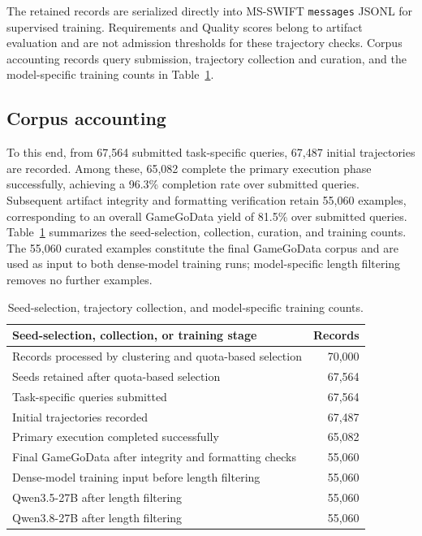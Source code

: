 \documentclass{article}
\begin{document}
The retained records are serialized directly into MS-SWIFT \texttt{messages} JSONL for supervised training. Requirements and Quality scores belong to artifact evaluation and are not admission thresholds for these trajectory checks. Corpus accounting records query submission, trajectory collection and curation, and the model-specific training counts in Table~\ref{tab:corpus_accounting}.

\subsection{Corpus accounting}
\label{app:corpus_accounting}

To this end, from 67{,}564 submitted task-specific queries, 67{,}487 initial trajectories are recorded. Among these, 65{,}082 complete the primary execution phase successfully, achieving a 96.3\% completion rate over submitted queries. Subsequent artifact integrity and formatting verification retain 55{,}060 examples, corresponding to an overall GameGoData yield of 81.5\% over submitted queries. Table~\ref{tab:corpus_accounting} summarizes the seed-selection, collection, curation, and training counts. The 55{,}060 curated examples constitute the final GameGoData corpus and are used as input to both dense-model training runs; model-specific length filtering removes no further examples.

\begin{table}[t]
\centering
\caption{Seed-selection, trajectory collection, and model-specific training counts.}
\label{tab:corpus_accounting}
\small
\begin{tabular}{@{}lr@{}}
\toprule
Seed-selection, collection, or training stage & Records \\
\midrule
Records processed by clustering and quota-based selection & 70,000 \\
Seeds retained after quota-based selection & 67,564 \\
Task-specific queries submitted & 67,564 \\
Initial trajectories recorded & 67,487 \\
Primary execution completed successfully & 65,082 \\
Final GameGoData after integrity and formatting checks & 55,060 \\
\midrule
Dense-model training input before length filtering & 55,060 \\
Qwen3.5-27B after length filtering & 55,060 \\
Qwen3.8-27B after length filtering & 55,060 \\
\bottomrule
\end{tabular}
\end{table}
\end{document}
